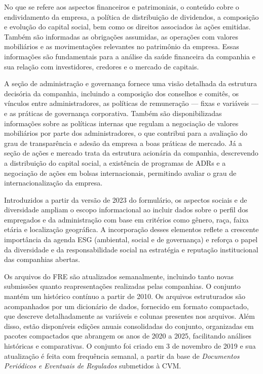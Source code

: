 \documentclass[recuosum=1.5cm]{iftex2024}
\begin{document}
No que se refere aos aspectos financeiros e patrimoniais, o conteúdo cobre o endividamento da empresa, a política de distribuição de dividendos, a composição e evolução do capital social, bem como os direitos associados às ações emitidas. Também são informadas as obrigações assumidas, as operações com valores mobiliários e as movimentações relevantes no patrimônio da empresa. Essas informações são fundamentais para a análise da saúde financeira da companhia e sua relação com investidores, credores e o mercado de capitais.

A seção de administração e governança fornece uma visão detalhada da estrutura decisória da companhia, incluindo a composição dos conselhos e comitês, os vínculos entre administradores, as políticas de remuneração — fixas e variáveis — e as práticas de governança corporativa. Também são disponibilizadas informações sobre as políticas internas que regulam a negociação de valores mobiliários por parte dos administradores, o que contribui para a avaliação do grau de transparência e adesão da empresa a boas práticas de mercado. Já a seção de ações e mercado trata da estrutura acionária da companhia, descrevendo a distribuição do capital social, a existência de programas de ADRs e a negociação de ações em bolsas internacionais, permitindo avaliar o grau de internacionalização da empresa.

Introduzidos a partir da versão de 2023 do formulário, os aspectos sociais e de diversidade ampliam o escopo informacional ao incluir dados sobre o perfil dos empregados e da administração com base em critérios como gênero, raça, faixa etária e localização geográfica. A incorporação desses elementos reflete a crescente importância da agenda ESG (ambiental, social e de governança) e reforça o papel da diversidade e da responsabilidade social na estratégia e reputação institucional das companhias abertas.

Os arquivos do FRE são atualizados semanalmente, incluindo tanto novas submissões quanto reapresentações realizadas pelas companhias. O conjunto mantém um histórico contínuo a partir de 2010. Os arquivos estruturados são acompanhados por um dicionário de dados, fornecido em formato compactado, que descreve detalhadamente as variáveis e colunas presentes nos arquivos. Além disso, estão disponíveis edições anuais consolidadas do conjunto, organizadas em pacotes compactados que abrangem os anos de 2020 a 2025, facilitando análises históricas e comparativas. O conjunto foi criado em 3 de novembro de 2019 e sua atualização é feita com frequência semanal, a partir da base de \textit{Documentos Periódicos e Eventuais de Regulados} submetidos à CVM.
\end{document}
